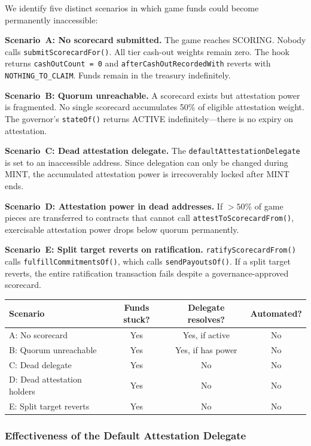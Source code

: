 \documentclass[11pt,a4paper]{article}
\begin{document}
We identify five distinct scenarios in which game funds could become permanently inaccessible:

\textbf{Scenario~A: No scorecard submitted.} The game reaches SCORING. Nobody calls \texttt{submitScorecardFor()}. All tier cash-out weights remain zero. The hook returns \texttt{cashOutCount = 0} and \texttt{afterCashOutRecordedWith} reverts with \texttt{NOTHING\_TO\_CLAIM}. Funds remain in the treasury indefinitely.

\textbf{Scenario~B: Quorum unreachable.} A scorecard exists but attestation power is fragmented. No single scorecard accumulates 50\% of eligible attestation weight. The governor's \texttt{stateOf()} returns ACTIVE indefinitely---there is no expiry on attestation.

\textbf{Scenario~C: Dead attestation delegate.} The \texttt{defaultAttestationDelegate} is set to an inaccessible address. Since delegation can only be changed during MINT, the accumulated attestation power is irrecoverably locked after MINT ends.

\textbf{Scenario~D: Attestation power in dead addresses.} If $>50\%$ of game pieces are transferred to contracts that cannot call \texttt{attestToScorecardFrom()}, exercisable attestation power drops below quorum permanently.

\textbf{Scenario~E: Split target reverts on ratification.} \texttt{ratifyScorecardFrom()} calls \texttt{fulfillCommitmentsOf()}, which calls \texttt{sendPayoutsOf()}. If a split target reverts, the entire ratification transaction fails despite a governance-approved scorecard.

\begin{table}[h]
\centering
\begin{tabular}{lccc}
\toprule
Scenario & Funds stuck? & Delegate resolves? & Automated? \\
\midrule
A: No scorecard & Yes & Yes, if active & No \\
B: Quorum unreachable & Yes & Yes, if has power & No \\
C: Dead delegate & Yes & No & No \\
D: Dead attestation holders & Yes & No & No \\
E: Split target reverts & Yes & No & No \\
\bottomrule
\end{tabular}
\end{table}

\subsubsection{Effectiveness of the Default Attestation Delegate}
\end{document}
